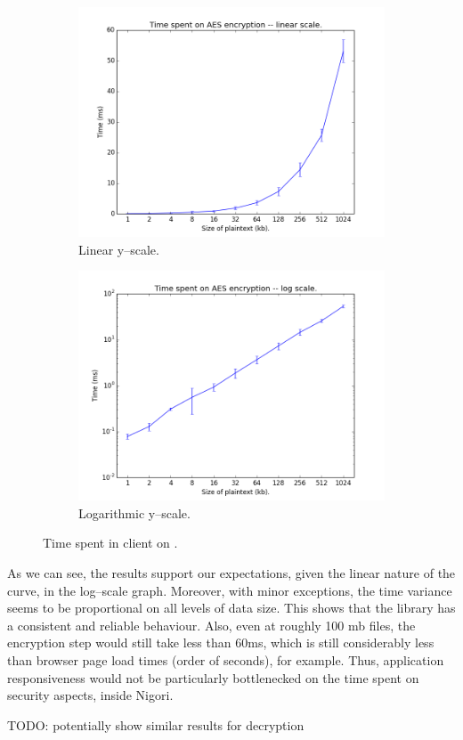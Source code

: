 \begin{figure}
\centering
\begin{subfigure}{.5\textwidth}
  \centering
  \includegraphics[width=1.1\linewidth]{images/aes_linear}
  \caption{Linear y--scale.}
\end{subfigure}%
\begin{subfigure}{.5\textwidth}
  \centering
  \includegraphics[width=1.1\linewidth]{images/aes_log}
  \caption{Logarithmic y--scale.}
\end{subfigure}
\caption{Time spent in client on .}
\label{fig:aes}
\end{figure}

As we can see, the results support our expectations, given the linear nature of the curve, in the log--scale graph.
Moreover, with minor exceptions, the time variance seems to be proportional on all levels of data size.
This shows that the library has a consistent and reliable behaviour.
Also, even at roughly 100 mb files, the encryption step would still take less than 60ms, which is still considerably less than browser page load times (order of seconds), for example.
Thus, application responsiveness would not be particularly bottlenecked on the time spent on security aspects, inside Nigori.

TODO: potentially show similar results for decryption
